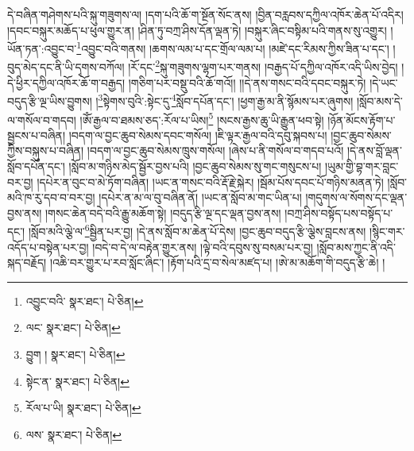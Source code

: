 དེ་བཞིན་གཤེགས་པའི་སྐུ་གཟུགས་ལ། །དག་པའི་ཆོ་ག་སྔོན་སོང་ནས། །བྱིན་བརླབས་དཀྱིལ་འཁོར་ཆེན་པོ་འདིར། །དབང་བསྐུར་མཆོད་པ་ཕུལ་གྱུར་ན། །ཤིན་ཏུ་བཀྲ་ཤིས་དོན་ལྡན་ཏེ། །བསྐུར་ཞིང་བསྟིམ་པའི་གནས་སུ་འགྱུར། །ཡོན་ཏན་:འབྱུང་བ་\footnote{འབྱུང་བའི་  སྣར་ཐང་།  པེ་ཅིན། }འབྱུང་བའི་གནས། །ཆགས་ལམ་པ་དང་གྲོལ་ལམ་པ། །མཛེ་དང་རིམས་ཀྱིས་ཟིན་པ་དང་། །བུད་མེད་དང་ནི་ཡི་དྭགས་བཀོལ། །རོ་དང་\footnote{ལང་  སྣར་ཐང་།  པེ་ཅིན། }སྐུ་གཟུགས་ལྷག་པར་གནས། །བརྒྱད་པོ་དཀྱིལ་འཁོར་འདི་ཡིས་བྱེད། །དེ་ཕྱིར་དཀྱིལ་འཁོར་ཆོ་ག་བརྒྱད། །གཅིག་པར་བསྡུ་བའི་ཆོ་གའོ།། །།དེ་ནས་གསང་བའི་དབང་བསྐུར་ཏེ། །དེ་ཡང་བདུད་རྩི་ལྔ་ཡིས་བྱུགས། །\footnote{བྱུག །  སྣར་ཐང་།  པེ་ཅིན། }སྟེགས་བུའི་:སྟེང་དུ་\footnote{སྟེང་ན་  སྣར་ཐང་།  པེ་ཅིན། }སློབ་དཔོན་དང་། །ཕྱག་རྒྱ་མ་ནི་སྙོམས་པར་ཞུགས། །སློབ་མས་དེ་ལ་གསོལ་བ་གདབ། །ཨོཾ་རྒྱལ་བ་ཐམས་ཅད་:རོལ་པ་ཡིས།\footnote{རོལ་པ་ཡི།  སྣར་ཐང་།  པེ་ཅིན། } །སངས་རྒྱས་ཆུ་ཡི་རྒྱུན་ཕབ་སྟེ། །ཉོན་མོངས་རྟོག་པ་སྦྱངས་པ་བཞིན། །བདག་ལ་བྱང་ཆུབ་སེམས་དབང་གསོལ། །ཇི་ལྟར་རྒྱལ་བའི་དབུ་སྐབས་པ། །བྱང་ཆུབ་སེམས་ཀྱིས་བསྐུས་པ་བཞིན། །བདག་ལ་བྱང་ཆུབ་སེམས་ཁྲུས་གསོལ། །ཞེས་པ་ནི་གསོལ་བ་གདབ་པའོ། །དེ་ནས་བློ་ལྡན་སློབ་དཔོན་དང་། །སློབ་མ་གཉིས་མེད་སྦྱོར་བྱས་པའི། །བྱང་ཆུབ་སེམས་སུ་གང་གསུངས་པ། །ཡུམ་གྱི་བྷ་གར་བླང་བར་བྱ། །དཔེར་ན་བུང་བ་མེ་ཏོག་བཞིན། །ཡང་ན་གསང་བའི་རྡོ་རྗེ་སྐེར། །སྦོམ་པོས་དབང་པོ་གཉིས་མནན་ཏེ། །སློབ་མའི་ཁ་རུ་དབ་བ་བར་བྱ། །དཔེར་ན་མ་ལ་བུ་བཞིན་ནོ། །ཡང་ན་སློབ་མ་གང་ཡིན་པ། །གདུགས་ལ་སོགས་དང་ལྡན་བྱས་ནས། །གསང་ཆེན་བདེ་བའི་རྒྱུ་མཆོག་སྟེ། །བདུད་རྩི་ལྔ་དང་ལྡན་བྱས་ནས། །བཀྲ་ཤིས་བསྟོད་པས་བསྟོད་པ་དང་། །སློབ་མའི་ལྕེ་ལ་\footnote{ལས་  སྣར་ཐང་།  པེ་ཅིན། }སྦྱིན་པར་བྱ། །དེ་ནས་སློབ་མ་ཆེན་པོ་དེས། །བྱང་ཆུབ་བདུད་རྩི་ལྕེས་བླངས་ནས། །སྙིང་གར་འདོད་པ་བསྟེན་པར་བྱ། །བདེ་བ་དེ་ལ་བརྟེན་གྱུར་ནས། །ལྟེ་བའི་དབུས་སུ་བསམ་པར་བྱ། །སློབ་མས་ཀྱང་ནི་འདི་སྐད་བརྗོད། །འཆི་བར་གྱུར་པ་རབ་སློང་ཞིང་། །རྟོག་པའི་དྲ་བ་སེལ་མཛད་པ། །ཨེ་མ་མཆོག་གི་བདུད་རྩི་ཆེ། །
